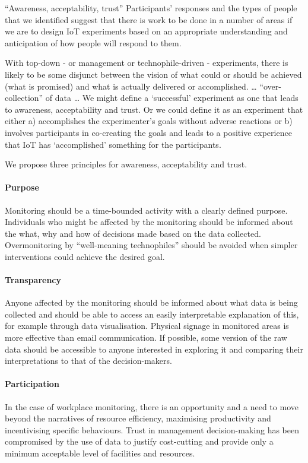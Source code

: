 

“Awareness, acceptability, trust”
Participants’ responses and the types of people that we identified
suggest that there is work to be done in a number of areas if we are
to design IoT experiments based on an appropriate understanding and
anticipation of how people will respond to them. 

With top-down - or management or technophile-driven - experiments,
there is likely to be some disjunct between the vision of what could
or should be achieved (what is promised) and what is actually
delivered or accomplished. … “over-collection” of data 
…
We might define a ‘successful’ experiment as one that leads to
awareness, acceptability and trust. Or we could define it as an
experiment that either a) accomplishes the experimenter’s goals
without adverse reactions or b) involves participants in co-creating
the goals and leads to a positive experience that IoT has
‘accomplished’ something for the participants.  

We propose three principles for awareness, acceptability and trust.

\paragraph{Purpose} Monitoring should be a time-bounded activity with
a clearly defined purpose. Individuals who might be affected by the
monitoring should be informed about the what, why and how of decisions
made based on the data collected. Overmonitoring by “well-meaning
technophiles” should be avoided when simpler interventions could
achieve the desired goal. 

\paragraph{Transparency} Anyone affected by the monitoring should be
informed about what data is being collected and should be able to
access an easily interpretable explanation of this, for example
through data visualisation. Physical signage in monitored areas is
more effective than email communication. If possible, some version of
the raw data should be accessible to anyone interested in exploring it
and comparing their interpretations to that of the decision-makers. 

\paragraph{Participation} In the case of workplace monitoring, there
is an opportunity and a need to move beyond the narratives of resource
efficiency, maximising productivity and incentivising specific
behaviours. Trust in management decision-making has been compromised
by the use of data to justify cost-cutting and provide only a minimum
acceptable level of facilities and resources. 

